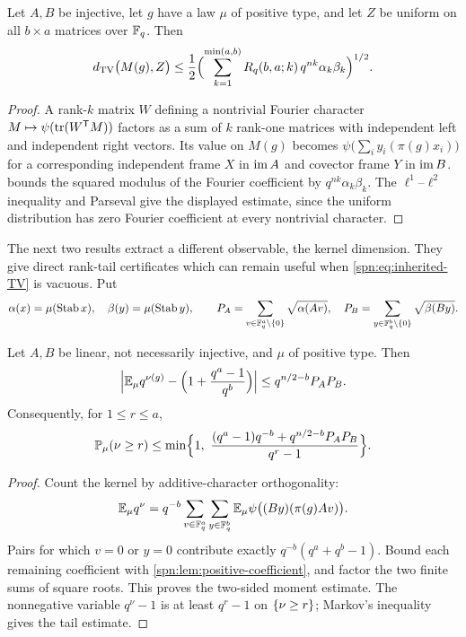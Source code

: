 \begin{theorem}\label{spn:thm:tv}
Let $A,B$ be injective, let $g$ have a law $\mu$ of positive type, and let $Z$
be uniform on all $b\times a$ matrices over $\F_q$. Then
\begin{equation}\label{spn:eq:inherited-TV}
 \spnTV\bigl(M(g),Z\bigr)\le\frac12\Bigl(\sum_{k=1}^{\min(a,b)}
 R_q(b,a;k)\,q^{nk}\alpha_k\beta_k\Bigr)^{1/2}.
\end{equation}
\end{theorem}

\begin{proof}
A rank-$k$ matrix $W$ defining a nontrivial Fourier character
$M\mapsto\psi(\tr(W^{\spnT}M))$ factors as a sum of $k$ rank-one matrices
with independent left and independent right vectors. Its value on $M(g)$
becomes $\psi\bigl(\sum_iy_i(\pi(g)x_i)\bigr)$ for a corresponding independent
frame $X$ in $\spnim A$ and covector frame $Y$ in $\spnim B$.
 bounds the squared modulus of the Fourier
coefficient by $q^{nk}\alpha_k\beta_k$. The $\ell^1$--$\ell^2$ inequality and
Parseval give the displayed estimate, since the uniform distribution has zero
Fourier coefficient at every nontrivial character.
\end{proof}

The next two results extract a different observable, the kernel dimension.
They give direct rank-tail certificates which can remain useful when
\eqref{spn:eq:inherited-TV} is vacuous. Put
\[
 \alpha(x)=\mu(\spnStab x),\quad\beta(y)=\mu(\spnStab y),\qquad
 P_A=\sum_{v\in\F_q^a\setminus\set{0}}\sqrt{\alpha(Av)},\quad
 P_B=\sum_{y\in\F_q^b\setminus\set{0}}\sqrt{\beta(By)} .
\]

\begin{proposition}\label{spn:prop:kernel-first-moment}
Let $A,B$ be linear, not necessarily injective, and $\mu$ of positive type.
Then
\begin{equation}\label{spn:eq:first-kernel-moment}
 \abs[\Big]{\spnE_\mu q^{\nu(g)}-\Bigl(1+\frac{q^a-1}{q^b}\Bigr)}
 \le q^{n/2-b}P_AP_B .
\end{equation}
Consequently, for $1\le r\le a$,
\begin{equation}\label{spn:eq:first-kernel-tail}
 \spnP_\mu(\nu\ge r)\le\min\Bigl\{1,\
 \frac{(q^a-1)q^{-b}+q^{n/2-b}P_AP_B}{q^r-1}\Bigr\}.
\end{equation}
\end{proposition}

\begin{proof}
Count the kernel by additive-character orthogonality:
\[
 \spnE_\mu q^\nu=q^{-b}\sum_{v\in\F_q^a}\sum_{y\in\F_q^b}
 \spnE_\mu\psi\bigl((By)(\pi(g)Av)\bigr).
\]
Pairs for which $v=0$ or $y=0$ contribute exactly $q^{-b}(q^a+q^b-1)$. Bound
each remaining coefficient with \cref{spn:lem:positive-coefficient}, and
factor the two finite sums of square roots. This proves the two-sided moment
estimate. The nonnegative variable $q^\nu-1$ is at least $q^r-1$ on
$\set{\nu\ge r}$; Markov's inequality gives the tail estimate.
\end{proof}

